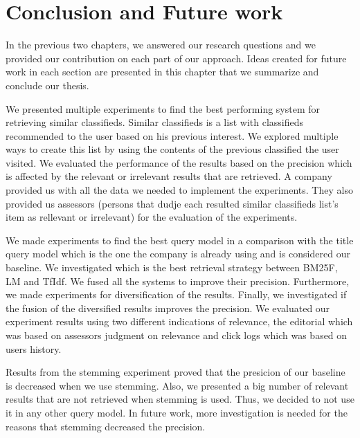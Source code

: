 \chapter{Conclusion and Future work}

In the previous two chapters, we answered our research questions and we provided our contribution on each part of our approach. Ideas created for future work in each section are presented in this chapter that we summarize and conclude our thesis.

We presented multiple experiments to find the best performing system for retrieving similar classifieds. Similar classifieds is a list with classifieds recommended to the user based on his previous interest. We explored multiple ways to create this list by using the contents of the previous classified the user visited. We evaluated the performance of the results based on the precision which is affected by the relevant or irrelevant results that are retrieved. A company provided us with all the data we needed to implement the experiments. They also provided us assessors (persons that dudje each resulted similar classifieds list's item as rellevant or irrelevant) for the evaluation of the experiments.


We made experiments to find the best query model in a comparison with the title query model which is the one the company is already using and is considered our baseline. We investigated which is the best retrieval strategy between BM25F, LM and TfIdf. We fused all the systems to improve their precision. Furthermore, we made experiments for diversification of the results. Finally, we investigated if the fusion of the diversified results improves the precision. We evaluated our experiment results using two different indications of relevance, the editorial which was based on assessors judgment on relevance and click logs which was based on users history.


Results from the stemming experiment proved that the presicion of our baseline is decreased when we use stemming. Also, we presented a big number of relevant results that are not retrieved when stemming is used. Thus, we decided to not use it in any other query model. In future work, more investigation is needed for the reasons that stemming decreased the precision.


